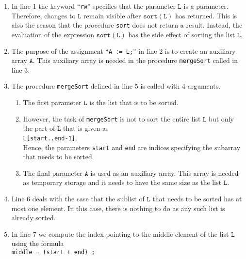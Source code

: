 \begin{enumerate}
\item In line 1 the keyword ``\texttt{rw}'' specifies that the parameter $\mathtt{L}$ is a
       parameter.  Therefore, changes to $\mathtt{L}$ remain
      visible after $\texttt{sort}(\mathtt{L})$ has returned.  This is also the reason that the procedure 
      \texttt{sort} does not return a result.  Instead, the evaluation of the expression
      $\mathtt{sort}(\mathtt{L})$ has the side effect of sorting the list $\mathtt{L}$.
\item The purpose of the assignment ``\texttt{A := L;}'' in line 2 is to create an auxiliary array
      $\texttt{A}$.  This auxiliary array is needed in the procedure
      \texttt{mergeSort} called in line 3.
\item The procedure \texttt{mergeSort} defined in line 5 is called with 4 arguments.
      \begin{enumerate}
      \item The first parameter $\texttt{L}$ is the list that is to be sorted.
      \item However, the task of \texttt{mergeSort} is not to sort the entire list $\texttt{L}$ but only
            the part of $\texttt{L}$ that is given as
            \\[0.2cm]
            \hspace*{1.3cm} 
            \texttt{L[start..end-1]}. 
            \\[0.2cm]
            Hence, the parameters \texttt{start} and \texttt{end} are indices specifying the 
            subarray that needs to be sorted.
      \item The final parameter $\texttt{A}$ is used as an auxiliary array.  This array is needed
            as temporary storage and it needs to have the same size as the list $\texttt{L}$.
      \end{enumerate} 
\item Line 6 deals with the case that the sublist of $\texttt{L}$ that needs to be sorted has at most one element.  
      In this case, there is nothing to do as any such list is already sorted.
\item In line 7 we compute the index pointing to the middle element of the list $\texttt{L}$ using the
      formula \\[0.2cm]
      \hspace*{1.3cm} 
      \texttt{middle = (start + end) ;} 
      \\[0.2cm]

\end{enumerate}
